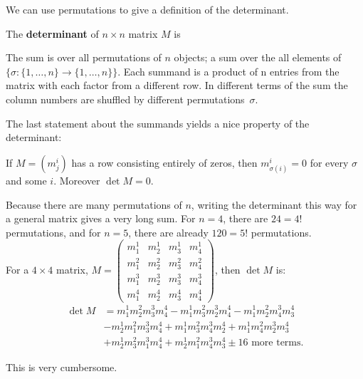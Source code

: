 

We can use permutations to give a definition of the determinant.

\begin{definition}  The {\bfseries determinant} of $n \times n$ matrix $M$ is 
\shabox{%
\[%
\det M = {\sum_{\sigma}}\  \sgn (\sigma)\,  m^1_{\sigma(1)}m^2_{\sigma(2)}\cdots m^n_{\sigma(n)}.
\]%
}%
\end{definition}
The sum is over all permutations of $n$ objects; a sum over the all elements of $\{ \sigma: \{1,\dots,n\}\to  \{1,\dots,n\}\}$.  Each summand is a product of n entries from the matrix  with each factor from a different row. 
In different terms of the sum the column numbers are shuffled by different permutations~$\sigma$.

The last statement about the summands yields a nice property of the determinant:
\begin{theorem}
If $M=(m^i_j)$ has a row consisting entirely of zeros, then $m^i_{\sigma(i)}=0$ for every $\sigma$ and some $i$.  Moreover
$\det M=0$.
\end{theorem}


\begin{example}
Because there are many permutations of $n$, writing the determinant this way for a general matrix gives a very long sum.  For $n=4$, there are $24=4!$ permutations, and for $n=5$, there are already $120=5!$ permutations.\\

\noindent
For a $4\times 4$ matrix, $M=\begin{pmatrix}
m^1_1 & m^1_2 & m^1_3 & m^1_4\\[1mm]
m^2_1 & m^2_2 & m^2_3 & m^2_4\\[1mm]
m^3_1 & m^3_2 & m^3_3 & m^3_4\\[1mm]
m^4_1 & m^4_2 & m^4_3 & m^4_4
\end{pmatrix}$, then $\det M$ is:
\begin{align*}
\det M
&=
 m^1_1m^2_2m^3_3m^4_4
-m^1_1m^2_3m^3_2m^4_4
-m^1_1m^2_2m^3_4m^4_3 \\[1mm]
& -m^1_2m^2_1m^3_3m^4_4
+m^1_1m^2_3m^3_4m^4_2
+m^1_1m^2_4m^3_2m^4_3 \\[1mm]
&+  m^1_2m^2_3m^3_1m^4_4
+m^1_2m^2_1m^3_4m^4_3
\pm \text{16 more terms}.
\end{align*}
\end{example}
This is very cumbersome.

